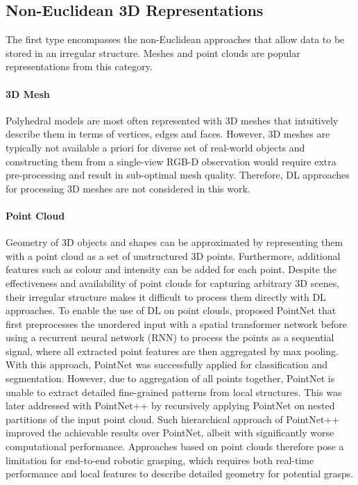 \newpage

\subsection{Non-Euclidean 3D Representations}

The first type encompasses the non-Euclidean approaches that allow data to be stored in an irregular structure. Meshes and point clouds are popular representations from this category.

\paragraph{3D Mesh} Polyhedral models are most often represented with 3D meshes that intuitively describe them in terms of vertices, edges and faces. However, 3D meshes are typically not available a priori for diverse set of real-world objects and constructing them from a single-view RGB-D observation would require extra pre-processing and result in sub-optimal mesh quality. Therefore, DL approaches for processing 3D meshes are not considered in this work.


\paragraph{Point Cloud} Geometry of 3D objects and shapes can be approximated by representing them with a point cloud as a set of unstructured 3D points. Furthermore, additional features such as colour and intensity can be added for each point. Despite the effectiveness and availability of point clouds for capturing arbitrary 3D scenes, their irregular structure makes it difficult to process them directly with DL approaches. To enable the use of DL on point clouds, \citet{ruizhongtai_qi_pointnet_2016} proposed PointNet that first preprocesses the unordered input with a spatial transformer network before using a recurrent neural network (RNN) to process the points as a sequential signal, where all extracted point features are then aggregated by max pooling. With this approach, PointNet was successfully applied for classification and segmentation. However, due to aggregation of all points together, PointNet is unable to extract detailed fine-grained patterns from local structures. This was later addressed with PointNet++ \cite{qi_pointnet_2017} by recursively applying PointNet on nested partitions of the input point cloud. Such hierarchical approach of PointNet++ improved the achievable results over PointNet, albeit with significantly worse computational performance. Approaches based on point clouds therefore pose a limitation for end-to-end robotic grasping, which requires both real-time performance and local features to describe detailed geometry for potential grasps.



